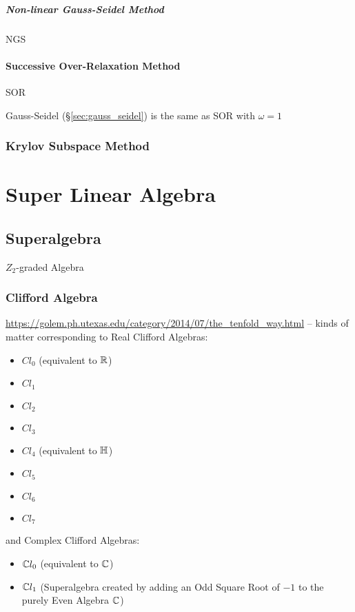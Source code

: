 \subparagraph{Non-linear Gauss-Seidel Method}
\label{sec:nonlinear_gauss_seidel}

NGS



\paragraph{Successive Over-Relaxation Method}
\label{sec:successive_over_relaxation}\hfill

SOR

Gauss-Seidel (\S\ref{sec:gauss_seidel}) is the same as SOR with $\omega = 1$



\subsubsection{Krylov Subspace Method}\label{sec:krylov_subspace_method}



\section{Super Linear Algebra}\label{sec:super_linear_algebra}

\subsection{Superalgebra}\label{sec:superalgebra}

$Z_2$-graded Algebra



\subsubsection{Clifford Algebra}\label{sec:clifford_algebra}

\url{https://golem.ph.utexas.edu/category/2014/07/the_tenfold_way.html} -- kinds
of matter corresponding to Real Clifford Algebras:
\begin{itemize}
\item $Cl_0$ (equivalent to $\mathbb{R}$)
\item $Cl_1$
\item $Cl_2$
\item $Cl_3$
\item $Cl_4$ (equivalent to $\mathbb{H}$)
\item $Cl_5$
\item $Cl_6$
\item $Cl_7$
\end{itemize}
and Complex Clifford Algebras:
\begin{itemize}
\item $\mathbb{C}{l}_0$ (equivalent to $\mathbb{C}$)
\item $\mathbb{C}{l}_1$ (Superalgebra created by adding an Odd Square Root of $-1$
  to the purely Even Algebra $\mathbb{C}$)
\end{itemize}
